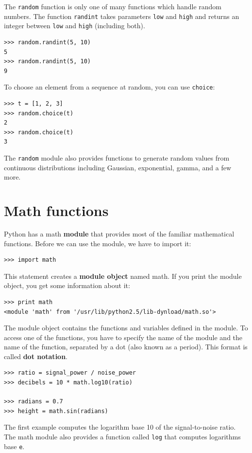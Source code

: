 \documentclass[10pt]{book}
\begin{document}
The {\tt random} function is only one of many 
functions which handle random numbers.
The function {\tt randint} takes parameters {\tt low} and
{\tt high} and returns an integer between {\tt low} and
{\tt high} (including both).


\beforeverb
\begin{verbatim}
>>> random.randint(5, 10)
5
>>> random.randint(5, 10)
9
\end{verbatim}
\afterverb
%
To choose an element from a sequence at random, you can use
{\tt choice}:


\beforeverb
\begin{verbatim}
>>> t = [1, 2, 3]
>>> random.choice(t)
2
>>> random.choice(t)
3
\end{verbatim}
\afterverb
%
The {\tt random} module also provides functions to generate
random values from continuous distributions including
Gaussian, exponential, gamma, and a few more.

\section{Math functions}

Python has a math {\bf module} that provides most of the familiar
mathematical functions.  
Before we can use the module, we have to import it:

\beforeverb
\begin{verbatim}
>>> import math
\end{verbatim}
\afterverb
%
This statement creates a {\bf module object} named math.  If
you print the module object, you get some information about it:

\beforeverb
\begin{verbatim}
>>> print math
<module 'math' from '/usr/lib/python2.5/lib-dynload/math.so'>
\end{verbatim}
\afterverb
%
The module object contains the functions and variables defined in the
module.  To access one of the functions, you have to specify the name
of the module and the name of the function, separated by a dot (also
known as a period).  This format is called {\bf dot notation}.


\beforeverb
\begin{verbatim}
>>> ratio = signal_power / noise_power
>>> decibels = 10 * math.log10(ratio)

>>> radians = 0.7
>>> height = math.sin(radians)
\end{verbatim}
\afterverb
%
The first example computes the logarithm base 10 of the
signal-to-noise ratio.  The math module also provides a
function called {\tt log} that computes logarithms base {\tt e}.
\end{document}
